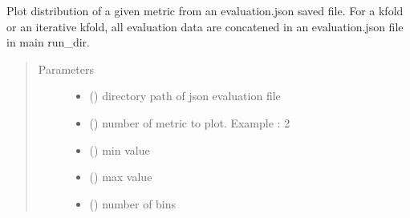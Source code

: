 \documentclass[letterpaper,10pt,english]{sphinxmanual}
\begin{document}

\begin{fulllineitems}
\label{\detokenize{pyterk:pyterk.reporter.plot_distribution}}
\sphinxAtStartPar
Plot distribution of a given metric from an evaluation.json saved file.
For a kfold or an iterative kfold, all evaluation data are concatened in an evaluation.json file in main run\_dir.
\begin{quote}\begin{description}
\item[{Parameters}] \leavevmode\begin{itemize}
\item {} 
\sphinxAtStartPar
{} () \textendash{} directory path of json evaluation file

\item {} 
\sphinxAtStartPar
{} () \textendash{} number of metric to plot. Example : 2

\item {} 
\sphinxAtStartPar
{} () \textendash{} min value

\item {} 
\sphinxAtStartPar
{} () \textendash{} max value

\item {} 
\sphinxAtStartPar
{} () \textendash{} number of bins


\end{itemize}
\end{description}
\end{quote}
\end{fulllineitems}
\end{document}
